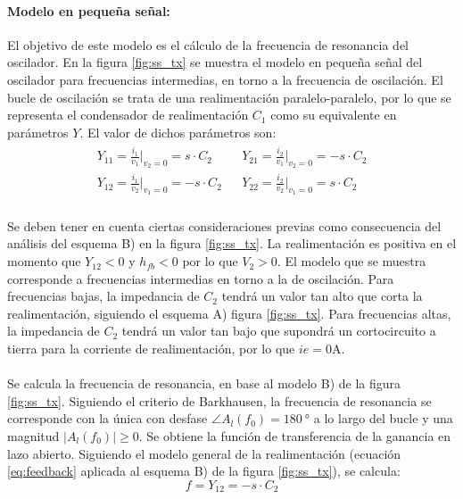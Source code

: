 \paragraph{Modelo en pequeña señal:} %
El objetivo de este modelo es el cálculo de la frecuencia de resonancia del oscilador. En la figura \ref{fig:ss_tx} se muestra el modelo en pequeña señal del oscilador para frecuencias intermedias, en torno a la frecuencia de oscilaci\'on. El bucle de oscilaci\'on se trata de una realimentación paralelo-paralelo, por lo que se representa el condensador de realimentación $C_1$ como su equivalente en par\'ametros $Y$. El valor de dichos par\'ametros son:
\[
\begin{array}{rl} 
      \begin{array}{l}
	 Y_{11} = \frac{i_1}{v_1}|_{v_2 = 0} = s \cdot C_2 \\
	 Y_{12} = \frac{i_1}{v_2}|_{v_1 = 0} = -s \cdot C_2 
      \end{array}
      &
      \begin{array}{l}
	 Y_{21} = \frac{i_2}{v_1}|_{v_2 = 0} = -s \cdot C_2 \\
	 Y_{22} = \frac{i_2}{v_2}|_{v_1 = 0} = s \cdot C_2 
      \end{array}
\end{array}
\]
\paragraph{}
Se deben tener en cuenta ciertas consideraciones previas como consecuencia del an\'alisis del esquema B) en la figura \ref{fig:ss_tx}. La realimentaci\'on es positiva en el momento que $Y_{12}<0$ y $h_{fb}<0$ por lo que $V_2>0$. El modelo que se muestra corresponde a frecuencias intermedias en torno a la de oscilaci\'on. Para frecuencias bajas, la impedancia de $C_2$ tendrá un valor tan alto que corta la realimentación, siguiendo el esquema A) figura \ref{fig:ss_tx}. 
Para frecuencias altas, la impedancia de $C_2$ tendr\'a un valor tan bajo que supondr\'a un cortocircuito a tierra para la corriente de realimentaci\'on, por lo que $ie = 0 \unit{\ampere}$.
\paragraph{}
Se calcula la frecuencia de resonancia, en base al modelo B) de la figura \ref{fig:ss_tx}. Siguiendo el criterio de Barkhausen, la frecuencia de resonancia se corresponde con la única con desfase $\angle A_l(f_0) = \SI{180}{\degree}$ a lo largo del bucle y una magnitud $|A_l(f_0)|\ge 0$. Se obtiene la funci\'on de transferencia de la ganancia en lazo abierto.
Siguiendo el modelo general de la realimentaci\'on (ecuaci\'on \ref{eq:feedback} aplicada al esquema B) de la figura \ref{fig:ss_tx}), se calcula: 
\begin{equation}
f = Y_{12} = -s \cdot C_2
\end{equation}
